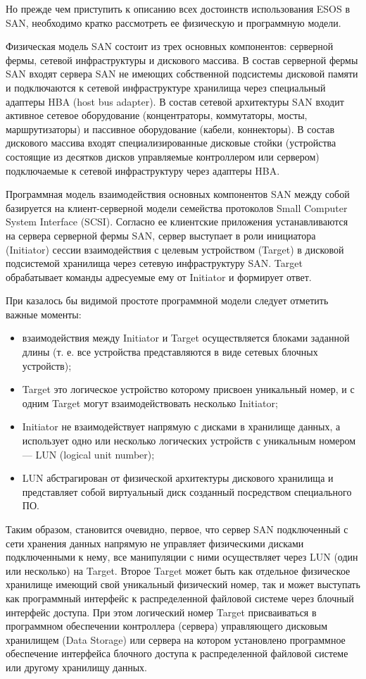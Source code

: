 \documentclass[10pt, a5paper]{article}
\begin{document}
Но прежде чем приступить к описанию всех достоинств использования ESOS в SAN, необходимо кратко рассмотреть ее  физическую и программную модели.

Физическая модель SAN состоит из трех основных компонентов: серверной фермы, сетевой инфраструктуры и дискового массива. В состав серверной фермы SAN входят сервера SAN не имеющих собственной подсистемы дисковой памяти и подключаются к сетевой инфраструктуре хранилища через специальный адаптеры HBA (host bus adapter). В состав сетевой архитектуры SAN входит активное сетевое оборудование (концентраторы, коммутаторы, мосты, маршрутизаторы)   и пассивное оборудование (кабели, коннекторы). В состав дискового массива входят  специализированные дисковые стойки (устройства состоящие из десятков дисков управляемые контроллером или сервером) подключаемые к сетевой инфраструктуру через адаптеры HBA.

Программная модель взаимодействия основных компонентов \linebreak SAN между собой базируется на клиент-серверной модели семейства протоколов Small Computer System Interface (SCSI). Согласно ее клиентские приложения устанавливаются на сервера серверной фермы SAN, сервер выступает в роли инициатора (Initiator) сессии взаимодействия с целевым устройством (Target) в дисковой подсистемой хранилища через сетевую инфраструктуру SAN. Target  обрабатывает команды адресуемые ему от Initiator и формирует ответ.

При казалось бы видимой простоте программной модели следует отметить важные моменты:

\begin{itemize}
  \item взаимодействия между Initiator и Target осуществляется блоками заданной длины (т. е. все устройства представляются в виде сетевых блочных устройств);
  \item Target это логическое устройство которому присвоен уникальный номер, и с одним Target могут взаимодействовать несколько Initiator;
  \item Initiator не взаимодействует напрямую с дисками в хранилище данных, а использует одно или несколько логических устройств с уникальным номером — LUN (logical unit number);
  \item LUN абстрагирован от физической архитектуры дискового хранилища и представляет собой виртуальный диск созданный посредством специального ПО.
\end{itemize}

Таким образом, становится очевидно, первое, что сервер SAN подключенный с сети хранения данных напрямую не управляет физическими дисками подключенными к нему, все манипуляции с ними осуществляет через LUN (один или несколько) на Target. Второе Target может быть как отдельное физическое хранилище имеющий свой уникальный физический номер, так и  может выступать как программный интерфейс к распределенной файловой системе через блочный интерфейс доступа. При этом логический номер Target присваиваться в программном обеспечении  контроллера  (сервера) управляющего дисковым хранилищем (Data Storage) или сервера на котором установлено программное обеспечение интерфейса блочного доступа к распределенной файловой системе или другому хранилищу данных.
\end{document}
